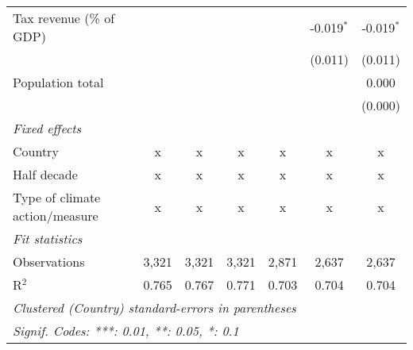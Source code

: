 \begin{tabular}{lcccccc}
   Tax revenue (\% of GDP)                   &         &         &               &              & -0.019$^{*}$  & -0.019$^{*}$\\   
                                             &         &         &               &              & (0.011)       & (0.011)\\   
   Population total                          &         &         &               &              &               & 0.000\\   
                                             &         &         &               &              &               & (0.000)\\   
   \emph{Fixed effects}\\
   Country                                   & x       & x       & x             & x            & x             & x\\  
   Half decade                               & x       & x       & x             & x            & x             & x\\  
   Type of climate action/measure            & x       & x       & x             & x            & x             & x\\  
   \midrule \emph{Fit statistics}\\
   Observations                              & 3,321   & 3,321   & 3,321         & 2,871        & 2,637         & 2,637\\  
   R$^2$                                     & 0.765   & 0.767   & 0.771         & 0.703        & 0.704         & 0.704\\  
   \midrule
   \multicolumn{7}{l}{\emph{Clustered (Country) standard-errors in parentheses}}\\
   \multicolumn{7}{l}{\emph{Signif. Codes: ***: 0.01, **: 0.05, *: 0.1}}\\
\end{tabular}
\par\endgroup


